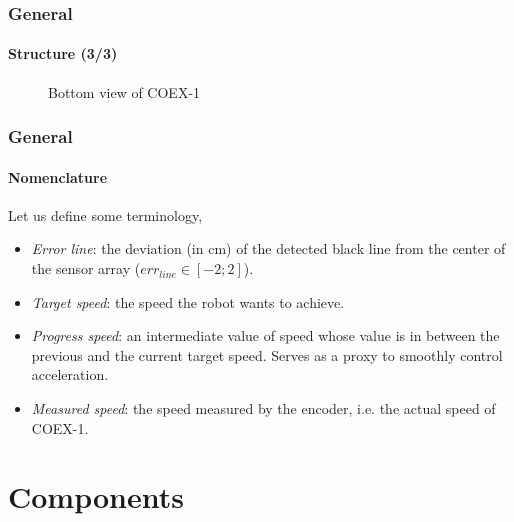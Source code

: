 \documentclass[10pt]{beamer}
\begin{document}

\begin{frame}
\frametitle{General}
\framesubtitle{Structure (3/3)}
\begin{figure}[hbtp]
\centering
\label{fig:fig-img-bottom}
\caption{Bottom view of COEX-1}
\end{figure}
\end{frame}


\begin{frame}
\frametitle{General}
\framesubtitle{Nomenclature}
Let us define some terminology,
\begin{itemize}
\item \textit{Error line}: the deviation (in cm) of the detected black line from the center of the sensor array ($err_{line} \in [-2;2]$).
\item \textit{Target speed}: the speed the robot wants to achieve.
\item \textit{Progress speed}: an intermediate value of speed whose value is in between the previous and the current target speed. Serves as a proxy to smoothly control acceleration.
\item \textit{Measured speed}: the speed measured by the encoder, i.e. the actual speed of COEX-1.
\end{itemize}
\end{frame}

\section{Components} 
\end{document}
